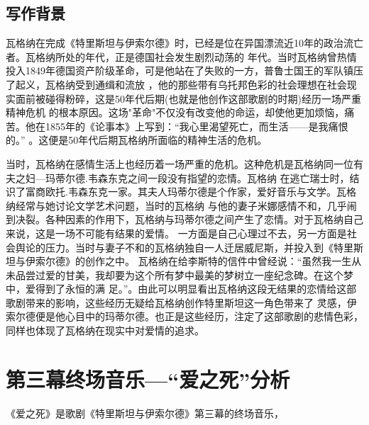 \documentclass[10pt,a4paper]{ctexart}
\newcommand{\upcite}[1]{\textsuperscript{\textsuperscript{\cite{#1}}}}
\begin{document}
 	\subsection*{写作背景}
    瓦格纳在完成《特里斯坦与伊索尔德》时，已经是位在异国漂流近10年的政治流亡者。瓦格纳所处的年代，正是德国社会发生剧烈动荡的
    年代。当时瓦格纳曾热情投入1849年德国资产阶级革命，可是他站在了失败的一方，普鲁士国王的军队镇压了起义，瓦格纳受到通缉和流放
    ，他的那些带有乌托邦色彩的社会理想在社会现实面前被碰得粉碎，这是50年代后期(也就是他创作这部歌剧的时期)经历一场严重精神危机
    的根本原因。这场"革命"不仅没有改变他的命运，却使他更加烦恼，痛苦。他在1855年的《论事本》上写到：“我心里渴望死亡，而生活——是我痛恨的。”
    \upcite{瓦格纳书信集}。这便是50年代后期瓦格纳所面临的精神生活的危机。

    当时，瓦格纳在感情生活上也经历着一场严重的危机。这种危机是瓦格纳同一位有夫之妇—玛蒂尔德.韦森东克之间一段没有指望的恋情。瓦格纳
    在逃亡瑞士时，结识了富商欧托.韦森东克一家。其夫人玛蒂尔德是个作家，爱好音乐与文学。瓦格纳经常与她讨论文学艺术问题，当时的瓦格纳
    与他的妻子米娜感情不和，几乎闹到决裂。各种因素的作用下，瓦格纳与玛蒂尔德之间产生了恋情。对于瓦格纳自己来说，这是一场不可能有结果的爱情。
    一方面是自己心理过不去，另一方面是社会舆论的压力。当时与妻子不和的瓦格纳独自一人迁居威尼斯，并投入到《特里斯坦与伊索尔德》的创作之中。
    瓦格纳在给李斯特的信件中曾经说：“虽然我一生从未品尝过爱的甘美，我却要为这个所有梦中最美的梦树立一座纪念碑。在这个梦中，爱得到了永恒的满
    足。”\upcite{瓦格纳李斯特}。由此可以明显看出瓦格纳这段无结果的恋情给这部歌剧带来的影响，这些经历无疑给瓦格纳创作特里斯坦这一角色带来了
    灵感，伊索尔德便是他心目中的玛蒂尔德。也正是这些经历，注定了这部歌剧的悲情色彩，同样也体现了瓦格纳在现实中对爱情的追求。
 	\section*{第三幕终场音乐—“爱之死”分析}
    《爱之死》是歌剧《特里斯坦与伊索尔德》第三幕的终场音乐，
    
    \renewcommand{\refname}{参考文献}
    
\end{document}

